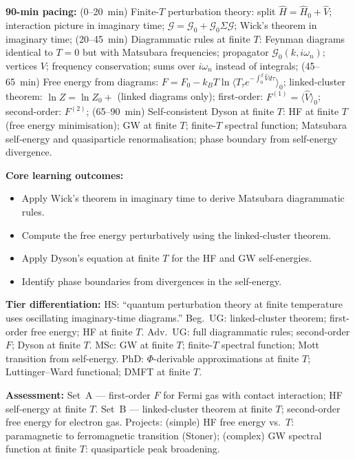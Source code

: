 \documentclass[11pt,a4paper]{article}
\begin{document}
\medskip

\begin{tcolorbox}[modulebox, title={Module~II.7 / L07: Perturbation Theory at Finite Temperature}]
\textbf{90-min pacing:} (0--20~min) Finite-$T$ perturbation theory: split $\hat{H}=\hat{H}_0+\hat{V}$; interaction picture in imaginary time; $\mathcal{G}=\mathcal{G}_0+\mathcal{G}_0\Sigma\mathcal{G}$; Wick's theorem in imaginary time; (20--45~min) Diagrammatic rules at finite $T$: Feynman diagrams identical to $T=0$ but with Matsubara frequencies; propagator $\mathcal{G}_0(k,i\omega_n)$; vertices $V$; frequency conservation; sums over $i\omega_n$ instead of integrals; (45--65~min) Free energy from diagrams: $F=F_0-k_BT\ln\langle T_\tau e^{-\int_0^\beta\hat{V}d\tau}\rangle_0$; linked-cluster theorem: $\ln Z=\ln Z_0+$ (linked diagrams only); first-order: $F^{(1)}=\langle\hat{V}\rangle_0$; second-order: $F^{(2)}$; (65--90~min) Self-consistent Dyson at finite $T$: HF at finite $T$ (free energy minimisation); GW at finite $T$; finite-$T$ spectral function; Matsubara self-energy and quasiparticle renormalisation; phase boundary from self-energy divergence.

\medskip\textbf{Core learning outcomes:}
\begin{itemize}[leftmargin=1.4em,topsep=2pt,itemsep=1pt]
  \item Apply Wick's theorem in imaginary time to derive Matsubara diagrammatic rules.
  \item Compute the free energy perturbatively using the linked-cluster theorem.
  \item Apply Dyson's equation at finite $T$ for the HF and GW self-energies.
  \item Identify phase boundaries from divergences in the self-energy.
\end{itemize}

\medskip\textbf{Tier differentiation:}
HS: ``quantum perturbation theory at finite temperature uses oscillating imaginary-time diagrams.''
Beg.\ UG: linked-cluster theorem; first-order free energy; HF at finite $T$.
Adv.\ UG: full diagrammatic rules; second-order $F$; Dyson at finite $T$.
MSc: GW at finite $T$; finite-$T$ spectral function; Mott transition from self-energy.
PhD: $\Phi$-derivable approximations at finite $T$; Luttinger--Ward functional; DMFT at finite $T$.

\medskip\textbf{Assessment:}
Set~A --- first-order $F$ for Fermi gas with contact interaction; HF self-energy at finite $T$.
Set~B --- linked-cluster theorem at finite $T$; second-order free energy for electron gas.
Projects: (simple) HF free energy vs.\ $T$: paramagnetic to ferromagnetic transition (Stoner);
(complex) GW spectral function at finite $T$: quasiparticle peak broadening.
\end{tcolorbox}
\end{document}

